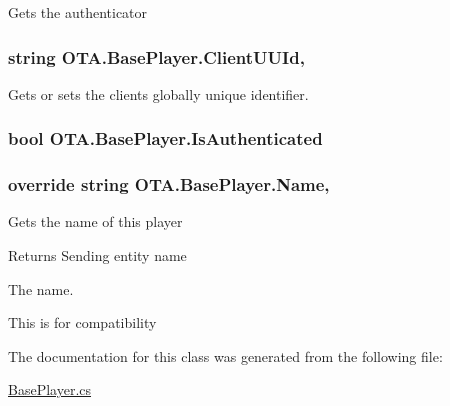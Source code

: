 Gets the authenticator 

\hypertarget{class_o_t_a_1_1_base_player_adcd3dc1f7dbda92ff30c68f0f34a5325}{}
\subsubsection[{Client\+U\+U\+Id}]{\setlength{\rightskip}{0pt plus 5cm}string O\+T\+A.\+Base\+Player.\+Client\+U\+U\+Id\hspace{0.3cm}{\ttfamily [get]}, {\ttfamily [set]}}\label{class_o_t_a_1_1_base_player_adcd3dc1f7dbda92ff30c68f0f34a5325}


Gets or sets the clients globally unique identifier. 

\hypertarget{class_o_t_a_1_1_base_player_a7d28034ac6e64c323e8ee3e0aabb0a4a}{}
\subsubsection[{Is\+Authenticated}]{\setlength{\rightskip}{0pt plus 5cm}bool O\+T\+A.\+Base\+Player.\+Is\+Authenticated\hspace{0.3cm}{\ttfamily [get]}}\label{class_o_t_a_1_1_base_player_a7d28034ac6e64c323e8ee3e0aabb0a4a}
\hypertarget{class_o_t_a_1_1_base_player_a7f586b5eaa831fe49cccc1062aaa3cc4}{}
\subsubsection[{Name}]{\setlength{\rightskip}{0pt plus 5cm}override string O\+T\+A.\+Base\+Player.\+Name\hspace{0.3cm}{\ttfamily [get]}, {}}\label{class_o_t_a_1_1_base_player_a7f586b5eaa831fe49cccc1062aaa3cc4}


Gets the name of this player 

\begin{DoxyReturn}{Returns}
Sending entity name
\end{DoxyReturn}


The name.

This is for compatibility

The documentation for this class was generated from the following file\+:\begin{DoxyCompactItemize}
\item 
\hyperlink{_base_player_8cs}{Base\+Player.\+cs}\end{DoxyCompactItemize}

